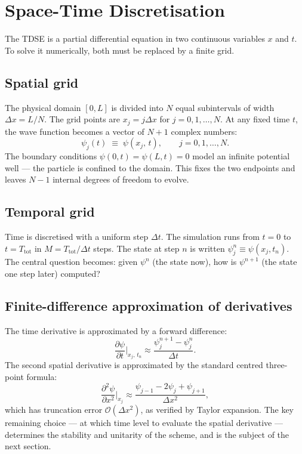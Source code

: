 \documentclass[a4paper,12pt]{article}
\newcommand{\dt}{\Delta t}
\newcommand{\dx}{\Delta x}
\begin{document}
\section{Space-Time Discretisation}

The TDSE is a partial differential equation in two continuous variables $x$ and
$t$.
To solve it numerically, both must be replaced by a finite grid.

\subsection{Spatial grid}

The physical domain $[0, L]$ is divided into $N$ equal subintervals of width
$\dx = L/N$.
The grid points are $x_j = j\dx$ for $j = 0, 1, \ldots, N$.
At any fixed time $t$, the wave function becomes a vector of $N+1$ complex
numbers:
\begin{equation}
  \psi_j(t) \;\equiv\; \psi(x_j,\,t), \qquad j = 0,1,\ldots,N.
\end{equation}
The boundary conditions $\psi(0,t) = \psi(L,t) = 0$ model an infinite potential
well — the particle is confined to the domain.
This fixes the two endpoints and leaves $N-1$ internal degrees of freedom to
evolve.

\subsection{Temporal grid}

Time is discretised with a uniform step $\dt$.
The simulation runs from $t=0$ to $t = T_\mathrm{tot}$ in
$M = T_\mathrm{tot}/\dt$ steps.
The state at step $n$ is written $\psi_j^n \equiv \psi(x_j, t_n)$.
The central question becomes: given $\psi^n$ (the state now), how is
$\psi^{n+1}$ (the state one step later) computed?

\subsection{Finite-difference approximation of derivatives}

The time derivative is approximated by a forward difference:
\begin{equation}
  \frac{\partial\psi}{\partial t}\bigg|_{x_j,\,t_n}
  \approx \frac{\psi_j^{n+1} - \psi_j^n}{\dt}.
\end{equation}
The second spatial derivative is approximated by the standard centred
three-point formula:
\begin{equation}
  \frac{\partial^2\psi}{\partial x^2}\bigg|_{x_j}
  \approx \frac{\psi_{j-1} - 2\psi_j + \psi_{j+1}}{\dx^2},
\end{equation}
which has truncation error $\mathcal{O}(\dx^2)$, as verified by Taylor
expansion.
The key remaining choice — at which time level to evaluate the spatial
derivative — determines the stability and unitarity of the scheme, and is the
subject of the next section.
\end{document}
